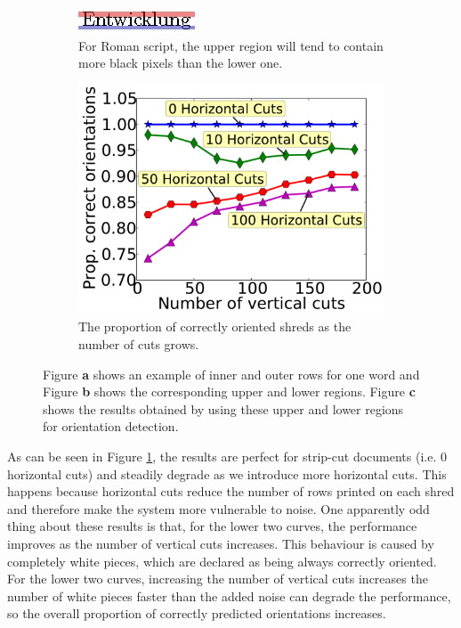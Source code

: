 \documentclass{llncs}
\begin{document}
\begin{figure}[t]
\begin{minipage}[b]{0.44\textwidth}
        \begin{subfigure}[b]{\textwidth}
          \includegraphics[width=\textwidth]{EntRow300.jpg}
          \caption{For Roman script, the upper region will tend to contain more black pixels than the lower one.}
        \end{subfigure}
     \end{minipage}
      \hfill
    \begin{subfigure}[b]{0.48\textwidth}
        \includegraphics[width=\textwidth]{rowOrient.pdf}
        \caption{The proportion of correctly oriented shreds as the number of cuts grows.}
    \end{subfigure}

     \caption{Figure {\bf a} shows an example of inner and outer rows for one word and Figure {\bf b} shows the corresponding upper and lower regions. Figure {\bf c} shows the results obtained by using these upper and lower regions for orientation detection.}
    \label{fig:rowOrient}
\end{figure}

As can be seen in Figure \ref{fig:rowOrient}, the results are perfect for strip-cut documents (i.e. 0 horizontal cuts) and steadily degrade as we introduce more horizontal cuts. This happens because horizontal cuts reduce the number of rows printed on each shred and therefore make the system more vulnerable to noise. One apparently odd thing about these results is that, for the lower two curves, the performance improves as the number of vertical cuts increases. This behaviour is caused by completely white pieces, which are declared as being always correctly oriented. For the lower two curves, increasing the number of vertical cuts increases the number of white pieces faster than the added noise can degrade the performance, so the overall proportion of correctly predicted orientations increases.
\end{document}
